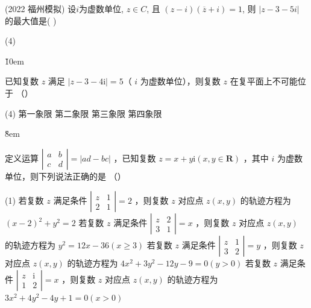 \vspace{6em}

\begin{example}(2022 福州模拟)
    设$i$为虚数单位, $z \in C$, 且 $(z-i)(\overline{z}+i)=1$, 则 $|z-3-5i|$ 的最大值是( \quad )
    \begin{tasks}(4)
    \end{tasks}
\end{example}

\v{10em}

\begin{example}
    已知复数 $z$ 满足 $|z-3-4 \mathrm{i}|=5$（ $i$ 为虚数单位），则复数 $z$ 在复平面上不可能位于 （\qquad）
    \begin{tasks}(4)
        \task 第一象限
        \task 第二象限
        \task 第三象限
        \task 第四象限
    \end{tasks}
\end{example}

\v{8em}

\begin{example}
    定义运算 $\left|\begin{array}{ll}a & b \\ c & d\end{array}\right|=|a d-b c|$ ，已知复数 $z=x+y \mathrm{i}(x, y \in \mathbf{R})$ ，其中 $i$ 为虚数单位，则下列说法正确的是 （\qquad）
    \begin{tasks}(1)
        \task 若复数 $z$ 满足条件 $\left|\begin{array}{ll}z & 1 \\ 2 & 1\end{array}\right|=2$ ，则复数 $z$ 对应点 $z(x, y)$ 的轨迹方程为 $(x-2)^2+y^2=2$
        \task 若复数 $z$ 满足条件 $\left|\begin{array}{ll}z & 2 \\ 3 & 1\end{array}\right|=x$ ，则复数 $z$ 对应点 $z(x, y)$ 的轨迹方程为 $y^2=12 x-36(x \geq 3)$
        \task 若复数 $z$ 满足条件 $\left|\begin{array}{ll}z & 1 \\ 3 & 2\end{array}\right|=y$ ，则复数 $z$ 对应点 $z(x, y)$ 的轨迹方程为 $4 x^2+3 y^2-12 y-9=0(y>0)$
        \task 若复数 $z$ 满足条件 $\left|\begin{array}{ll}z & \mathrm{i} \\ 1 & 2\end{array}\right|=x$ ，则复数 $z$ 对应点 $z(x, y)$ 的轨迹方程为 $3 x^2+4 y^2-4 y+1=0(x>0)$
    \end{tasks}
\end{example}

